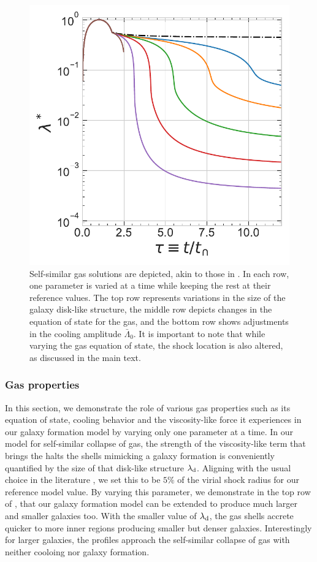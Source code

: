 \begin{figure}[htbp]
\includegraphics[width=0.325\linewidth,trim={0 0cm 0 0},clip]{plots/Eds-gaso_trajectory_shocked_vary-cooling.pdf}
\caption{Self-similar gas solutions are depicted, akin to those in .  In each row, one parameter is varied at a time while keeping the rest at their reference values. The top row represents variations in the size of the galaxy disk-like structure, the middle row depicts changes in the equation of state for the gas, and the bottom row shows adjustments in the cooling amplitude $\bar{\Lambda}_0$. It is important to note that while varying the gas equation of state, the shock location is also altered, as discussed in the main text.} %
\label{fig:gaso-all2}
\end{figure}



\subsubsection{Gas properties}
In this section, we demonstrate the role of various gas properties such as its equation of state, cooling behavior and the viscosity-like force it experiences in our galaxy formation model by varying only one parameter at a time.
In our model for self-similar collapse of gas, the strength of the viscosity-like term that brings the halts the shells mimicking a galaxy formation is conveniently quantified by the size of that disk-like structure $\lambda_{\rm d}$. Aligning with the usual choice in the literature \cite{2006Dekel&Birnboim}, we set this to be $5\%$ of the virial shock radius for our reference model value. By varying this parameter, we demonstrate in the top row of , that our galaxy formation model can be extended to produce much larger and smaller galaxies too. With the smaller value of $\lambda_{\rm d}$, the gas shells accrete quicker to more inner regions producing smaller but denser galaxies. Interestingly for larger galaxies, the profiles approach the self-similar collapse of gas with neither cooloing nor galaxy formation.

